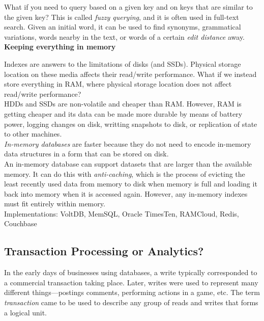 \documentclass[12pt, titlepage]{article}
\begin{document}
What if you need to query based on a given key and on keys that are similar to the given key? This is called \textit{fuzzy querying}, and it is often used in full-text search. Given an initial word, it can be used to find synonyms, grammatical variations, words nearby in the text, or words of a certain \textit{edit distance} away. \\

\textbf{Keeping everything in memory} \medskip

Indexes are answers to the limitations of disks (and SSDs). Physical storage location on these media affects their read/write performance. What if we instead store everything in RAM, where physical storage location does not affect read/write performance? \\

HDDs and SSDs are non-volatile and cheaper than RAM. However, RAM is getting cheaper and its data can be made more durable by means of battery power, logging changes on disk, writting snapshots to disk, or replication of state to other machines. \\

\textit{In-memory databases} are faster because they do not need to encode in-memory data structures in a form that can be stored on disk. \\

An in-memory database can support datasets that are larger than the available memory. It can do this with \textit{anti-caching}, which is the process of evicting the least recently used data from memory to disk when memory is full and loading it back into memory when it is accessed again. However, any in-memory indexes must fit entirely within memory. \\

Implementations: VoltDB, MemSQL, Oracle TimesTen, RAMCloud, Redis, Couchbase

\subsection{Transaction Processing or Analytics?}

In the early days of businesses using databases, a write typically corresponded to a commercial transaction taking place. Later, writes were used to represent many different things---postings comments, performing actions in a game, etc. The term \textit{transaction} came to be used to describe any group of reads and writes that forms a logical unit. \\
\end{document}
